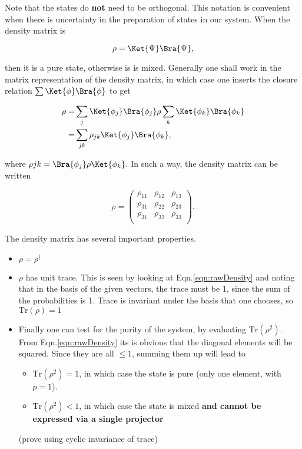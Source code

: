 \noindent Note that the states do \textbf{not} need to be orthogonal. This notation is convenient when there is uncertainty in the preparation of states in our system. When the density matrix is

\begin{equation}
\rho = \Ket{\Psi}\Bra{\Psi},
\end{equation}

\noindent then it is a pure state, otherwise is is mixed. Generally one shall work in the matrix representation of the density matrix, in which case one inserts the closure relation $\sum\Ket{\phi}\Bra{\phi}$ to get

\begin{equation}
\begin{aligned}
\rho = & \sum_j\Ket{\phi_j}\Bra{\phi_j}\rho\sum_k\Ket{\phi_k}\Bra{\phi_k}\\
= & \sum_{jk}\rho_{jk} \Ket{\phi_j} \Bra{\phi_k},
\end{aligned}
\end{equation}

\noindent where $\rho{jk}=\Bra{\phi_j}\rho\Ket{\phi_k}$. In such a way, the density matrix can be written

\begin{equation}
\rho = \left( \begin{matrix}
\rho_{11} & \rho_{12} & \rho_{13} \\
\rho_{31} & \rho_{22} & \rho_{23} \\
\rho_{31} & \rho_{32} & \rho_{33} \\
\end{matrix}\right).
\end{equation}

\noindent The density matrix has several important properties.

\begin{itemize}
	\item $\rho = \rho^{\dagger}$
	\item $\rho$ has unit trace. This is seen by looking at Eqn.\eqref{eqn:rawDensity} and noting that in the basis of the given vectors, the trace must be 1, since the sum of the probabilities is 1. Trace is invariant under the basis that one chooses, so $\text{Tr}(\rho) = 1$
	\item Finally one can test for the purity of the system, by evaluating $\text{Tr}(\rho^2)$. From Eqn.\eqref{eqn:rawDensity} its is obvious that the diagonal elements will be squared. Since they are all $\le1$, summing them up will lead to
	\begin{itemize}
		\item $\text{Tr}(\rho^2) = 1$, in which case the state is pure (only one element, with $p=1$).
		\item $\text{Tr}(\rho^2) < 1$, in which case the state is mixed \textbf{and cannot be expressed via a single projector}
	\end{itemize}
	\textbf{} (prove using cyclic invariance of trace)
\end{itemize}

